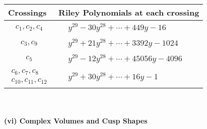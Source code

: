 \documentclass[1p]{elsarticle_modified}
\theoremstyle{definition}
\begin{document}
\begin{tabular}{m{50pt}|m{274pt}}
Crossings & \hspace{64pt}Riley Polynomials at each crossing \\
\hline $$\begin{aligned}c_{1},c_{2},c_{4}\end{aligned}$$&$\begin{aligned}
&y^{29}-30 y^{28}+\cdots+449 y-16
\end{aligned}$\\
\hline $$\begin{aligned}c_{3},c_{9}\end{aligned}$$&$\begin{aligned}
&y^{29}+21 y^{28}+\cdots+3392 y-1024
\end{aligned}$\\
\hline $$\begin{aligned}c_{5}\end{aligned}$$&$\begin{aligned}
&y^{29}-12 y^{28}+\cdots+45056 y-4096
\end{aligned}$\\
\hline $$\begin{aligned}c_{6},c_{7},c_{8}\\c_{10},c_{11},c_{12}\end{aligned}$$&$\begin{aligned}
&y^{29}+30 y^{28}+\cdots+16 y-1
\end{aligned}$\\
\hline
\end{tabular}\\~\\
\newpage\flushleft \textbf{(vi) Complex Volumes and Cusp Shapes}
\end{document}
